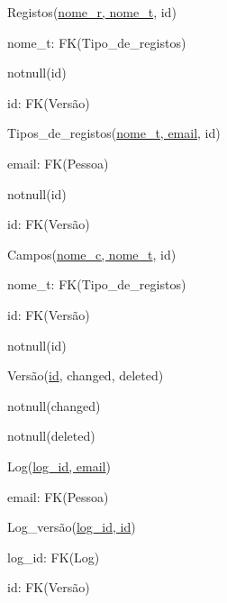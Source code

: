 \documentclass[11pt,a4paper]{article}
\begin{document}
\begin{description}[noitemsep]
	\item Registos(\underline{nome\_r, nome\_t},  id)
	\item nome\_t: FK(Tipo\_de\_registos)
	\item notnull(id)
	\item id: FK(Vers\~{a}o)
\end{description}

\begin{description}[noitemsep]
	\item Tipos\_de\_registos(\underline{nome\_t, email}, id)
	\item email: FK(Pessoa)
	\item notnull(id)
	\item id: FK(Vers\~{a}o)
\end{description}
\newpage

\begin{description}[noitemsep]
	\item Campos(\underline{nome\_c, nome\_t}, id)
	\item nome\_t: FK(Tipo\_de\_registos)
	\item id: FK(Vers\~{a}o)
	\item notnull(id)
\end{description}

\begin{description}[noitemsep]
	\item Vers\~{a}o(\underline{id}, changed, deleted)
	\item notnull(changed)
	\item notnull(deleted)
\end{description}

\begin{description}[noitemsep]
	\item Log(\underline{log\_id, email})
	\item email: FK(Pessoa)
\end{description}

\begin{description}[noitemsep]
	\item Log\_vers\~{a}o(\underline{log\_id, id})
	\item log\_id: FK(Log)
	\item id: FK(Vers\~{a}o)
\end{description}
\end{document}

